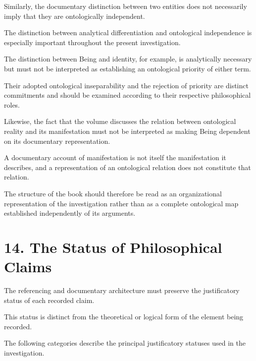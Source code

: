 Similarly, the documentary distinction
between two entities does not necessarily
imply that they are ontologically independent.

The distinction between analytical differentiation
and ontological independence is especially
important throughout the present investigation.

The distinction between Being and identity,
for example, is analytically necessary but
must not be interpreted as establishing
an ontological priority of either term.

Their adopted ontological inseparability
and the rejection of priority are distinct
commitments and should be examined according
to their respective philosophical roles.

Likewise, the fact that the volume discusses
the relation between ontological reality
and its manifestation must not be interpreted
as making Being dependent on its documentary
representation.

A documentary account of manifestation is
not itself the manifestation it describes,
and a representation of an ontological relation
does not constitute that relation.

The structure of the book should therefore
be read as an organizational representation
of the investigation rather than as a complete
ontological map established independently
of its arguments.


\section*{14. The Status of Philosophical Claims}

The referencing and documentary architecture
must preserve the justificatory status of
each recorded claim.

This status is distinct from the theoretical
or logical form of the element being recorded.

The following categories describe the principal
justificatory statuses used in the investigation.

